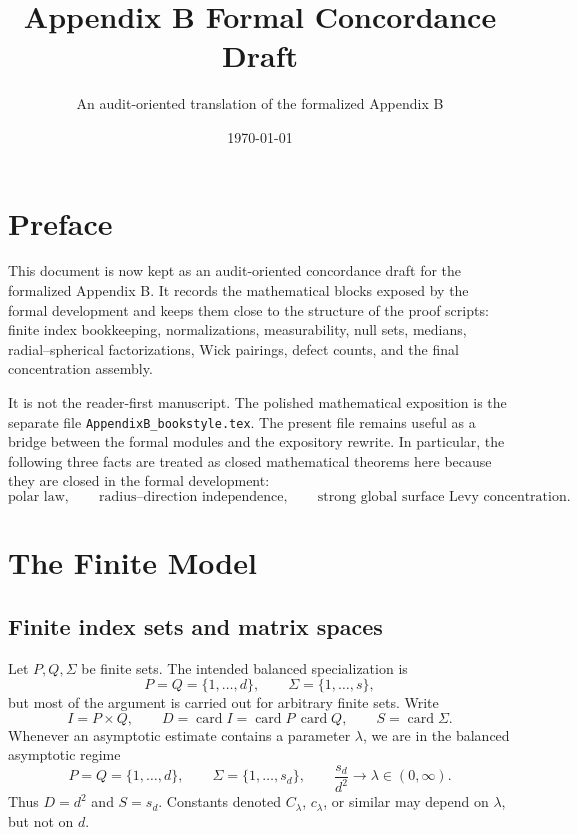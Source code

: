 \documentclass[11pt,oneside]{book}
\title{Appendix B Formal Concordance Draft}
\author{An audit-oriented translation of the formalized Appendix B}
\date{\today}
\DeclareMathOperator{\card}{card}
\newcommand{\1}{\mathbf 1}
\begin{document}
\frontmatter
\maketitle

\chapter*{Preface}

This document is now kept as an audit-oriented concordance draft for the
formalized Appendix B.  It records the mathematical blocks exposed by the
formal development and keeps them close to the structure of the proof scripts:
finite index bookkeeping, normalizations, measurability, null sets, medians,
radial--spherical factorizations, Wick pairings, defect counts, and the final
concentration assembly.

It is not the reader-first manuscript.  The polished mathematical exposition is
the separate file \texttt{AppendixB\_bookstyle.tex}.  The present file remains
useful as a bridge between the formal modules and the expository rewrite.  In
particular, the following three facts are treated as closed mathematical
theorems here because they are closed in the formal development:
\[
  \text{polar law},\qquad
  \text{radius--direction independence},\qquad
  \text{strong global surface Levy concentration}.
\]

\tableofcontents

\mainmatter

\chapter{The Finite Model}

\section{Finite index sets and matrix spaces}

Let \(P,Q,\Sigma\) be finite sets.  The intended balanced specialization is
\[
  P=Q=\{1,\ldots,d\},\qquad \Sigma=\{1,\ldots,s\},
\]
but most of the argument is carried out for arbitrary finite sets.  Write
\[
  I=P\times Q,\qquad D=\card I=\card P\,\card Q,\qquad S=\card\Sigma .
\]
Whenever an asymptotic estimate contains a parameter \(\lambda\), we are in
the balanced asymptotic regime
\[
  P=Q=\{1,\ldots,d\},\qquad \Sigma=\{1,\ldots,s_d\},\qquad
  \frac{s_d}{d^2}\longrightarrow \lambda\in(0,\infty).
\]
Thus \(D=d^2\) and \(S=s_d\).  Constants denoted \(C_\lambda\), \(c_\lambda\),
or similar may depend on \(\lambda\), but not on \(d\).
\end{document}
